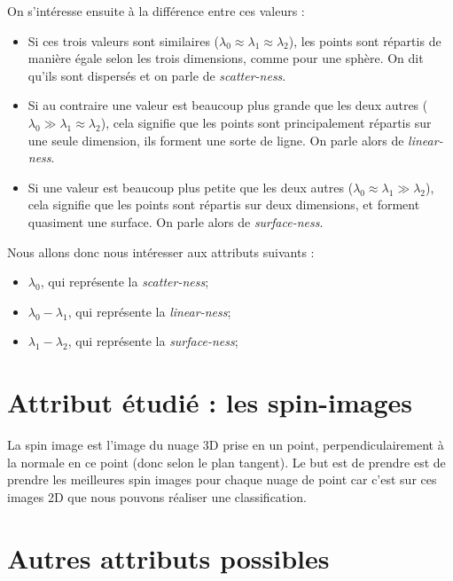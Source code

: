 		On s’intéresse ensuite à la différence entre ces valeurs :
		\begin{itemize}
			\item Si ces trois valeurs sont similaires ($\lambda_0 \approx \lambda_1 \approx \lambda_2$), les points sont répartis de manière égale selon les trois dimensions, comme pour une sphère. On dit qu'ils sont dispersés et on parle de \emph{scatter-ness}.
			\item Si au contraire une valeur est beaucoup plus grande que les deux autres ($\lambda_0 \gg \lambda_1 \approx \lambda_2$), cela signifie que les points sont principalement répartis sur une seule dimension, ils forment une sorte de ligne. On parle alors de \emph{linear-ness}.
			\item Si une valeur est beaucoup plus petite que les deux autres ($\lambda_0 \approx \lambda_1 \gg \lambda_2$), cela signifie que les points sont répartis sur deux dimensions, et forment quasiment une surface. On parle alors de \emph{surface-ness}.\\
		\end{itemize}

		Nous allons donc nous intéresser aux attributs suivants :
		\begin{itemize}
			\item $\lambda_0$, qui représente la \emph{scatter-ness};
			\item $\lambda_0 - \lambda_1$, qui représente la \emph{linear-ness};
			\item $\lambda_1 - \lambda_2$, qui représente la \emph{surface-ness};
		\end{itemize}

\section{Attribut étudié : les spin-images}

	La spin image est l’image du nuage 3D prise en un point, perpendiculairement à la normale en ce point (donc selon le plan tangent). Le but est de prendre est de prendre les meilleures spin images pour chaque nuage de point car c’est sur ces images 2D que nous pouvons réaliser une classification.




\section{Autres attributs possibles}
